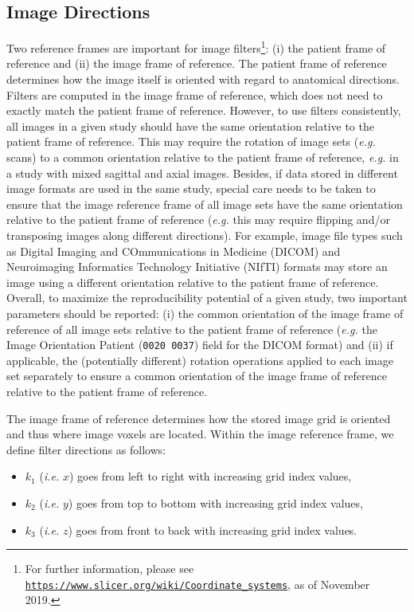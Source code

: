 \documentclass[fleqn,a4paper,oneside,openany]{book}
\begin{document}
\subsection{Image Directions}\label{sec:imageDirections}
%
Two reference frames are important for image filters\footnote{For further information, please see \texttt{\url{https://www.slicer.org/wiki/Coordinate_systems}}, as of November 2019.}: (i) the patient frame of reference and (ii) the image frame of reference. The patient frame of reference determines how the image itself is oriented with regard to anatomical directions. Filters are computed in the image frame of reference, which does not need to exactly match the patient frame of reference. However, to use filters consistently, all images in a given study should have the same orientation relative to the patient frame of reference. This may require the rotation of image sets (\textit{e.g.} scans) to a common orientation relative to the patient frame of reference, \textit{e.g.} in a study with mixed sagittal and axial images. Besides, if data stored in different image formats are used in the same study, special care needs to be taken to ensure that the image reference frame of all image sets have the same orientation relative to the patient frame of reference (\textit{e.g.} this may require flipping and/or transposing images along different directions). For example, image file types such as Digital Imaging and COmmunications in Medicine (DICOM) and Neuroimaging Informatics Technology Initiative (NIfTI) formats may store an image using a different orientation relative to the patient frame of reference. Overall, to maximize the reproducibility potential of a given study, two important parameters should be reported: (i) the common orientation of the image frame of reference of all image sets relative to the patient frame of reference (\textit{e.g.} the Image Orientation Patient (\texttt{0020 0037}) field for the DICOM format) and (ii) if applicable, the (potentially different) rotation operations applied to each image set separately to ensure a common orientation of the image frame of reference relative to the patient frame of reference.  

The image frame of reference determines how the stored image grid is oriented and thus where image voxels are located. Within the image reference frame, we define filter directions as follows:
\begin{itemize}
    \item $k_1$ (\textit{i.e.} $x$) goes from left to right with increasing grid index values,
    \item $k_2$ (\textit{i.e.} $y$) goes from top to bottom  with increasing grid index values,
    \item $k_3$ (\textit{i.e.} $z$) goes from front to back  with increasing grid index values.
\end{itemize}
\end{document}
